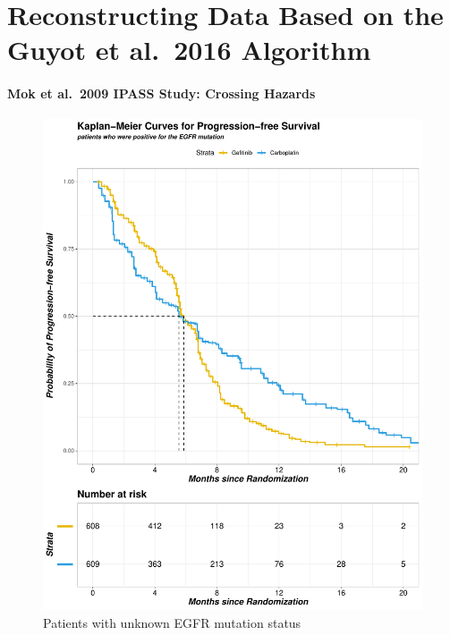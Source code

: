 \documentclass[12pt,twoside]{reedthesis}
\begin{document}
\hypertarget{math-sci}{%
\chapter{Reconstructing Data Based on the Guyot et al.~2016 Algorithm}\label{math-sci}}

\hypertarget{mok-et-al.-2009-ipass-study-crossing-hazards}{%
\subsubsection{Mok et al.~2009 IPASS Study: Crossing Hazards}\label{mok-et-al.-2009-ipass-study-crossing-hazards}}
\begin{figure}

{\centering \includegraphics[scale=0.55]{figure/mok.2.a} 

}

\caption{Patients with unknown EGFR mutation status}\label{fig:unnamed-chunk-3}
\end{figure}
\clearpage
\end{document}
